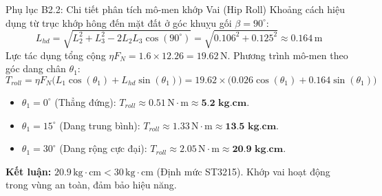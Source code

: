 \documentclass[10pt,aspectratio=169]{beamer}
\begin{document}
\begin{frame}{Phụ lục B2.2: Chi tiết phân tích mô-men khớp Vai (Hip Roll)}
  Khoảng cách hiệu dụng từ trục khớp hông đến mặt đất ở góc khuỵu gối $\beta = 90^\circ$:
  \begin{equation*}
      L_{hd} = \sqrt{L_2^2 + L_3^2 - 2L_2L_3\cos(90^\circ)} = \sqrt{0.106^2 + 0.125^2} \approx 0.164\,\text{m}
  \end{equation*}
  Lực tác dụng tổng cộng $\eta F_N = 1.6 \times 12.26 = 19.62\,\text{N}$. 
  Phương trình mô-men theo góc dang chân $\theta_1$:
  \begin{equation*}
      T_{roll} = \eta F_N \big(L_1 \cos(\theta_1) + L_{hd} \sin(\theta_1)\big) = 19.62 \times \big(0.026 \cos(\theta_1) + 0.164 \sin(\theta_1)\big)
  \end{equation*}
  \begin{itemize}
      \item $\theta_1 = 0^\circ$ (Thẳng đứng): $T_{roll} \approx 0.51\,\text{N}\cdot\text{m} \approx \textbf{5.2 kg.cm}$.
      \item $\theta_1 = 15^\circ$ (Dang trung bình): $T_{roll} \approx 1.33\,\text{N}\cdot\text{m} \approx \textbf{13.5 kg.cm}$.
      \item $\theta_1 = 30^\circ$ (Dang rộng cực đại): $T_{roll} \approx 2.05\,\text{N}\cdot\text{m} \approx \textbf{20.9 kg.cm}$.
  \end{itemize}
  \vspace{0.2cm}
  \textbf{Kết luận:} $20.9\,\text{kg}\cdot\text{cm} < 30\,\text{kg}\cdot\text{cm}$ (Định mức ST3215). Khớp vai hoạt động trong vùng an toàn, đảm bảo hiệu năng.
\end{frame}
\end{document}
